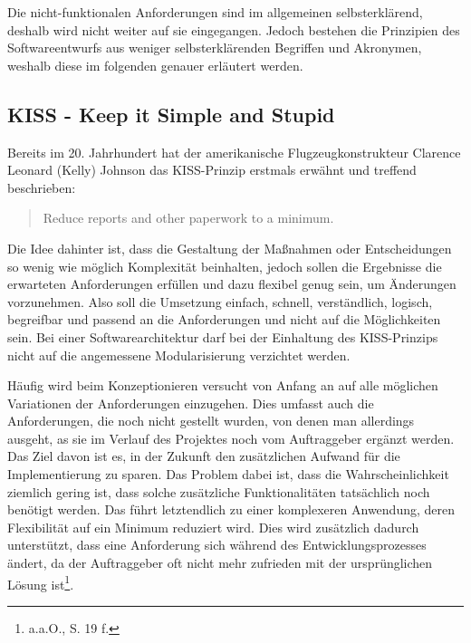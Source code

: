 Die nicht-funktionalen Anforderungen sind im allgemeinen selbsterklärend, deshalb wird nicht weiter auf sie eingegangen. Jedoch bestehen die Prinzipien des Softwareentwurfs aus weniger selbsterklärenden Begriffen und Akronymen, weshalb diese im folgenden genauer erläutert werden.

\subsection*{KISS - Keep it Simple and Stupid}

Bereits im 20. Jahrhundert hat der amerikanische Flugzeugkonstrukteur Clarence Leonard (Kelly) Johnson das \ac{KISS}-Prinzip erstmals erwähnt und treffend beschrieben:
\begin{quote}
\glqq{}Reduce reports and other paperwork to a minimum.\grqq{} \autocite[][231]{biography}
\end{quote}

Die Idee dahinter ist, dass die Gestaltung der Maßnahmen oder Entscheidungen so wenig wie möglich Komplexität beinhalten, jedoch sollen die Ergebnisse die erwarteten Anforderungen erfüllen und dazu flexibel genug sein, um Änderungen vorzunehmen. Also soll die Umsetzung einfach, schnell, verständlich, logisch, begreifbar und passend an die Anforderungen und nicht auf die Möglichkeiten sein. Bei einer Softwarearchitektur darf bei der Einhaltung des \ac{KISS}-Prinzips nicht auf die angemessene Modularisierung verzichtet werden\autocite[Vgl.][19]{gmodse}.

Häufig wird beim Konzeptionieren versucht von Anfang an auf alle möglichen Variationen der Anforderungen einzugehen. Dies umfasst auch die Anforderungen, die noch nicht gestellt wurden, von denen man allerdings ausgeht, as sie im Verlauf des Projektes noch vom Auftraggeber ergänzt werden. Das Ziel davon ist es, in der Zukunft den zusätzlichen Aufwand für die Implementierung zu sparen. Das Problem dabei ist, dass die Wahrscheinlichkeit ziemlich gering ist, dass solche zusätzliche Funktionalitäten tatsächlich noch benötigt werden. Das führt letztendlich zu einer komplexeren Anwendung, deren Flexibilität auf ein Minimum reduziert wird. Dies wird zusätzlich dadurch unterstützt, dass eine Anforderung sich während des Entwicklungsprozesses ändert, da der Auftraggeber oft nicht mehr zufrieden mit der ursprünglichen Lösung ist\footnote{a.a.O., S. 19 f.}.
\\
\linebreak

\begingroup

